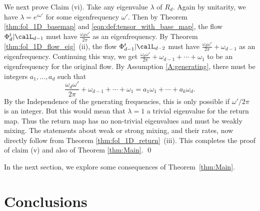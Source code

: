 \documentclass[12pt,oneside]{article}
\newcommand{\Return}{R}
\begin{document}
We next prove Claim (vi). Take any eigenvalue $\lambda$ of $\Return_d$. Again by unitarity, we have $\lambda = e^{\iota \omega'}$ for some eigenfrequency $\omega'$. Then by Theorem \ref{thm:fol_1D_basemap} and \eqref{eqn:def:tensor_with_base_map}, the flow $\Phi_d^t | \calL_{d-1}$ must have $\frac{\omega_{d} \omega'}{2\pi}$ as an eigenfrequency. By Theorem \ref{thm:fol_1D_flow_eig}~(ii), the flow $\Phi_{d-1}^t | \calL_{d-2}$ must have $\frac{\omega_{d} \omega'}{2\pi} + \omega_{d-1}$ as an eigenfrequency. Continuing this way, we get $\frac{\omega_{d} \omega'}{2\pi} + \omega_{d-1} + \cdots + \omega_1$ to be an eigenfrequency for the original flow. By Assumption \ref{A:generating}, there must be integers $a_1, \ldots, a_d$ such that 
%
\[\frac{\omega_{d} \omega'}{2\pi} + \omega_{d-1} + \cdots + \omega_1 = a_1 \omega_1 + \cdots + a_k \omega_d .\]
%
By the Independence of the generating frequencies, this is only possible if $\omega'/2\pi$ is an integer. But this would mean that  $\lambda=1$ a trivial eigenvalue for the return map. Thus the return map has no non-trivial eigenvalues and must be weakly mixing. The statements about weak or strong mixing, and their rates, now directly follow from Theorem \ref{thm:fol_1D_return}~(iii). This completes the proof of claim (v) and also of Theorem \ref{thm:Main}. \qed

In the next section, we explore some consequences of Theorem~\ref{thm:Main}.

\section{Conclusions} \label{sec:conclus}
\end{document}
